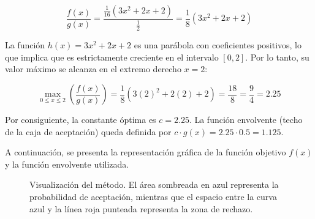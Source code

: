 \documentclass[12pt, a4paper]{article}
\begin{document}
	\begin{equation}
		\frac{f(x)}{g(x)} = \frac{\frac{1}{16}(3x^2 + 2x + 2)}{\frac{1}{2}} = \frac{1}{8}(3x^2 + 2x + 2)
	\end{equation}
	
	La función $h(x) = 3x^2 + 2x + 2$ es una parábola con coeficientes positivos, lo que implica que es estrictamente creciente en el intervalo $[0, 2]$. Por lo tanto, su valor máximo se alcanza en el extremo derecho $x = 2$:
	
	\begin{equation}
		\max_{0 \leq x \leq 2} \left( \frac{f(x)}{g(x)} \right) = \frac{1}{8}(3(2)^2 + 2(2) + 2) = \frac{18}{8} = \frac{9}{4} = 2.25
	\end{equation}
	
	Por consiguiente, la constante óptima es $c = 2.25$. La función envolvente (techo de la caja de aceptación) queda definida por $c \cdot g(x) = 2.25 \cdot 0.5 = 1.125$.
	
	A continuación, se presenta la representación gráfica de la función objetivo $f(x)$ y la función envolvente utilizada.
	
	\begin{figure}[H]
		\centering
		\caption{Visualización del método. El área sombreada en azul representa la probabilidad de aceptación, mientras que el espacio entre la curva azul y la línea roja punteada representa la zona de rechazo.}
		\label{fig:grafica_rechazo}
	\end{figure}
	
\end{document}
